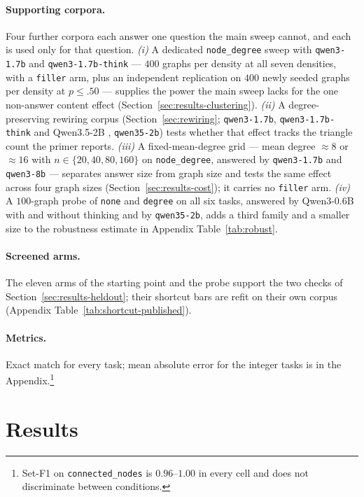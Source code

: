 \documentclass[11pt]{article}
\begin{document}
\paragraph{Supporting corpora.} Four further corpora each answer one
question the main sweep cannot, and each is used only for that question.
\emph{(i)} A dedicated \texttt{node\_degree} sweep with
\texttt{qwen3-1.7b} and \texttt{qwen3-1.7b-think} --- $400$ graphs per
density at all seven densities, with a \texttt{filler} arm, plus an
independent replication on $400$ newly seeded graphs per density at
$p\le.50$ --- supplies the power the main sweep lacks for the one
non-answer content effect (Section~\ref{sec:results-clustering}).
\emph{(ii)} A degree-preserving rewiring corpus
(Section~\ref{sec:rewiring}; \texttt{qwen3-1.7b},
\texttt{qwen3-1.7b-think} and Qwen3.5-2B \citep{qwen35},
\texttt{qwen35-2b}) tests whether that effect tracks the triangle count
the primer reports. \emph{(iii)} A fixed-mean-degree grid --- mean degree
$\approx 8$ or $\approx 16$ with $n\in\{20,40,80,160\}$ on
\texttt{node\_degree}, answered by \texttt{qwen3-1.7b} and
\texttt{qwen3-8b} --- separates answer size from graph size and tests the
same effect across four graph sizes (Section~\ref{sec:results-cost}); it
carries no \texttt{filler} arm. \emph{(iv)} A $100$-graph probe of
\texttt{none} and \texttt{degree} on all six tasks, answered by Qwen3-0.6B
with and without thinking and by \texttt{qwen35-2b}, adds a third family
and a smaller size to the robustness estimate in Appendix
Table~\ref{tab:robust}.

\paragraph{Screened arms.} The eleven arms of the starting point and the
probe support the two checks of Section~\ref{sec:results-heldout}; their
shortcut bars are refit on their own corpus (Appendix
Table~\ref{tab:shortcut-published}).

\paragraph{Metrics.} Exact match for every task; mean absolute error for
the integer tasks is in the Appendix.\footnote{Set-F1 on
\texttt{connected\_nodes} is $0.96$--$1.00$ in every cell and does not
discriminate between conditions.}

\section{Results}
\label{sec:results}
\end{document}
